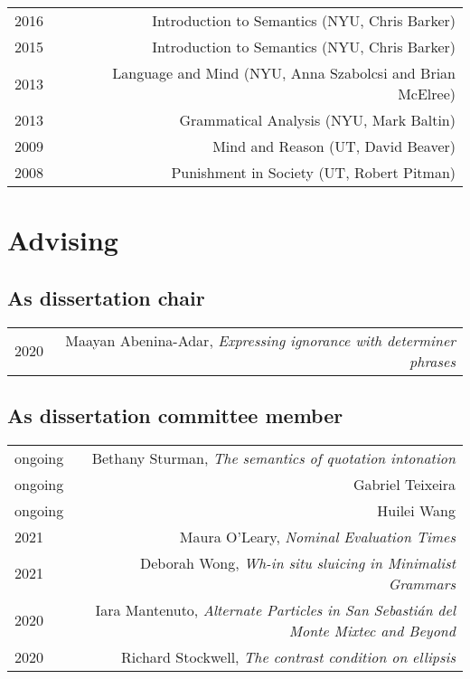 \documentclass[12pt]{article}
\begin{document}
\begin{longtable}{LR}
  2016 & Introduction to Semantics (NYU, Chris Barker)
         \\
  2015 & Introduction to Semantics (NYU, Chris Barker)
         \\
  2013 & Language and Mind (NYU, Anna Szabolcsi and Brian McElree)
         \\
  2013 & Grammatical Analysis (NYU, Mark Baltin)
         \\
  2009 & Mind and Reason (UT, David Beaver)
         \\
  2008 & Punishment in Society (UT, Robert Pitman)
\end{longtable}


\medskip

\section*{Advising}

\subsection*{As dissertation chair}

\begin{longtable}{LR}
  2020    & Maayan Abenina-Adar, \textit{Expressing ignorance with determiner phrases}
\end{longtable}

\subsection*{As dissertation committee member}

\begin{longtable}{LR}
  ongoing & Bethany Sturman, \textit{The semantics of quotation intonation}\\
  ongoing & Gabriel Teixeira\\
  ongoing & Huilei Wang\\
  2021    & Maura O'Leary, \textit{Nominal Evaluation Times}\\
  2021    & Deborah Wong, \textit{Wh-in situ sluicing in Minimalist Grammars}\\
  2020    & Iara Mantenuto, \textit{Alternate Particles in San Sebasti\'{a}n del
            Monte Mixtec and Beyond}\\
  2020    & Richard Stockwell, \textit{The contrast condition on ellipsis}
\end{longtable}
\end{document}
